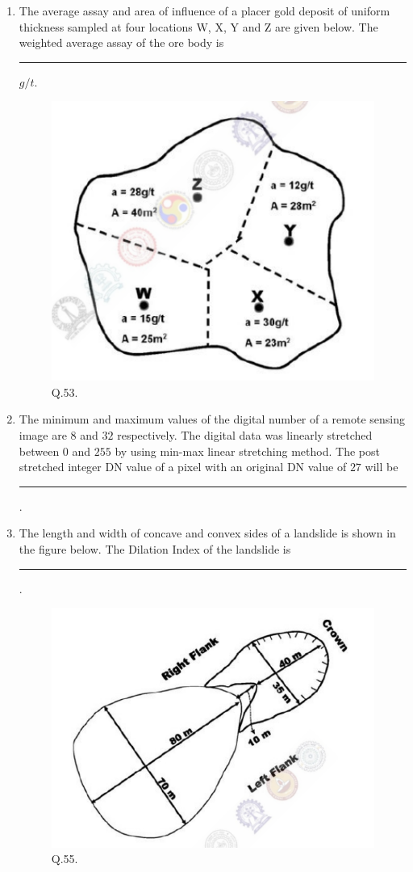 \documentclass[journal,12pt,onecolumn]{IEEEtran}
\theoremstyle{remark}
\begin{document}
\begin{enumerate}
    \item The average assay  and area of influence  of a placer gold deposit of uniform thickness sampled at four locations W, X, Y and Z are given below. The weighted average assay of the ore body is \rule{3cm}{0.15mm} $g/t$. \hfill{}
        \begin{figure}[h]
            \centering
            \includegraphics[width=0.5\columnwidth]{Figs/fig_8.png}
            \caption{Q.53.}
            \label{fig:placeholder_8}
        \end{figure}
    
    \item The minimum and maximum values of the digital number  of a remote sensing image are $8$ and $32$ respectively. The digital data was linearly stretched between $0$ and $255$ by using min-max linear stretching method. The post stretched integer DN value of a pixel with an original DN value of $27$ will be \rule{3cm}{0.15mm}. \hfill{}
    
    \item The length and width of concave and convex sides of a landslide is shown in the figure below. The Dilation Index of the landslide is \rule{3cm}{0.15mm}. \hfill{}
    
        \begin{figure}[h]
            \centering
            \includegraphics[width=0.5\columnwidth]{Figs/fig_9.png}
            \caption{Q.55.}
            \label{fig:placeholder_9}
        \end{figure}
    

\end{enumerate}
\end{document}

